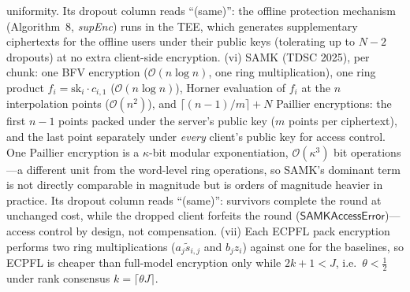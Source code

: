 \begin{table}[t]
\begin{minipage}{\linewidth}
uniformity. Its dropout column reads ``(same)'': the offline protection
mechanism (Algorithm~8, \emph{supEnc}) runs in the TEE, which generates
supplementary ciphertexts for the offline users under their public keys
(tolerating up to $N-2$ dropouts) at no extra client-side encryption.
(vi) SAMK (TDSC 2025), per chunk: one BFV encryption
($\mathcal{O}(n\log n)$, one ring multiplication), one ring product
$f_i=\mathrm{sk}_i\cdot c_{i,1}$ ($\mathcal{O}(n\log n)$), Horner
evaluation of $f_i$ at the $n$ interpolation points ($\mathcal{O}(n^{2})$),
and $\lceil(n-1)/m\rceil+N$ Paillier encryptions: the first $n-1$ points
packed under the server's public key ($m$ points per ciphertext), and the
last point separately under \emph{every} client's public key for access
control. One Paillier encryption is a $\kappa$-bit modular exponentiation,
$\mathcal{O}(\kappa^{3})$ bit operations---a different unit from the
word-level ring operations, so SAMK's dominant term is not directly
comparable in magnitude but is orders of magnitude heavier in practice.
Its dropout column reads ``(same)'': survivors complete the round at
unchanged cost, while the dropped client forfeits the round
($\mathsf{SAMKAccessError}$)---access control by design, not compensation.
(vii) Each ECPFL pack encryption performs two ring multiplications
($a_j\tilde{s}_{i,j}$ and $b_j z_i$) against one for the baselines, so
ECPFL is cheaper than full-model encryption only while $2k+1<J$, i.e.\
$\theta<\tfrac12$ under rank consensus $k=\lceil\theta J\rceil$.
\end{minipage}
\end{table}
